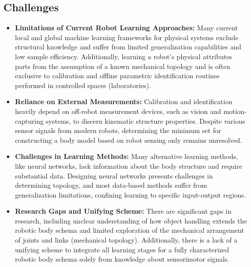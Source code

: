 \documentclass[12pt, a4paper]{article}
\newcommand{\redtext}[1]{\textcolor{red}{#1}}
\begin{document}
\subsection*{Challenges}
\begin{itemize}
    \item \textbf{Limitations of Current Robot Learning Approaches:} Many current local and global machine learning frameworks for physical systems exclude structural knowledge and suffer from limited generalization capabilities and low sample efficiency. Additionally, learning a robot's physical attributes parts from the assumption of a known mechanical topology and is often exclusive to calibration and offline parametric identification routines performed in controlled spaces (laboratories).

	\item \textbf{Reliance on External Measurements:} Calibration and identification heavily depend on off-robot measurement devices, such as vision and motion-capturing systems, to discern kinematic structure properties. Despite various sensor signals from modern robots, determining the minimum set for constructing a body model based on robot sensing only remains unresolved.

	\item \textbf{Challenges in Learning Methods:} Many alternative learning methods, like neural networks, lack information about the body structure and require substantial data. Designing neural networks presents challenges in determining topology, and most data-based methods suffer from generalization limitations, confining learning to specific input-output regions.

	\item \textbf{Research Gaps and Unifying Scheme:} There are significant gaps in research, including unclear understanding of how object handling extends the robotic body schema and limited exploration of the mechanical arrangement of joints and links (mechanical topology). Additionally, there is a lack of a unifying scheme to integrate all learning stages for a fully characterized robotic body schema solely from knowledge about sensorimotor signals. 
\end{itemize}
\end{document}

